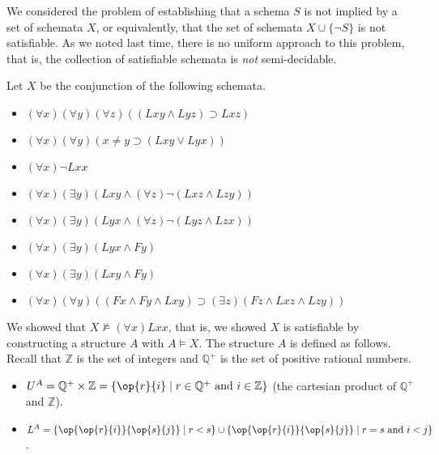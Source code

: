 We considered the problem of establishing that a schema $S$ is not implied by a set of schemata $X$, or equivalently, that the set of schemata $X\cup\{\neg S\}$ is not satisfiable. As we noted last time, there is no uniform approach to this problem, that is, the collection of satisfiable schemata is \emph{not} semi-decidable.

Let $X$ be the conjunction of the following schemata.
\begin{itemize}
\item 
$(\forall x)(\forall y)(\forall z)((Lxy \wedge Lyz) \supset Lxz)$
\item
$(\forall x)(\forall y)(x\neq y\supset(Lxy \vee Lyx))$
\item
$(\forall x) \neg Lxx$
\item 
$(\forall x)(\exists y)(Lxy\wedge (\forall z)\neg (Lxz\wedge Lzy))$
\item 
$(\forall x)(\exists y)(Lyx\wedge (\forall z)\neg (Lyz\wedge Lzx))$
\item
$(\forall x)(\exists y)(Lyx\wedge Fy)$
\item
$(\forall x)(\exists y)(Lxy\wedge Fy)$
\item
$(\forall x)(\forall y)((Fx\wedge Fy\wedge Lxy)\supset (\exists z)(Fz\wedge Lxz\wedge Lzy))$
\end{itemize}

We showed that $X\not\models(\forall x)Lxx$, that is, we showed $X$ is satisfiable by constructing a structure $A$ with $A\models X$. The structure $A$ is defined as follows. Recall that $\mathbb{Z}$ is the set of integers and $\mathbb{Q}^+$ is the set of positive rational numbers.
\begin{itemize}
\item
$U^A= \mathbb{Q}^+\times\mathbb{Z}=\{\op{r}{i}\mid r\in\mathbb{Q}^+\mbox{ and}\ i\in \mathbb{Z}\}$ (the cartesian product of $\mathbb{Q}^+$ and $\mathbb{Z}$).
\item
$L^A=\{\op{\op{r}{i}}{\op{s}{j}}\mid r<s\}\cup\{\op{\op{r}{i}}{\op{s}{j}}\mid r=s\mbox{ and }i<j\}$.
\end{itemize}

